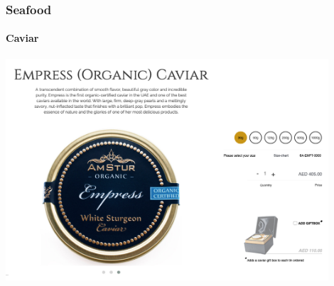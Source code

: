 \documentclass[10pt]{beamer}
\begin{document}
\begin{frame}
\frametitle{Seafood}
\framesubtitle{Caviar}

	\begin{center}
		\includegraphics[width=0.9\textwidth]{figures/caviar2.png}\\
	\end{center}
\end{frame}
\end{document}
